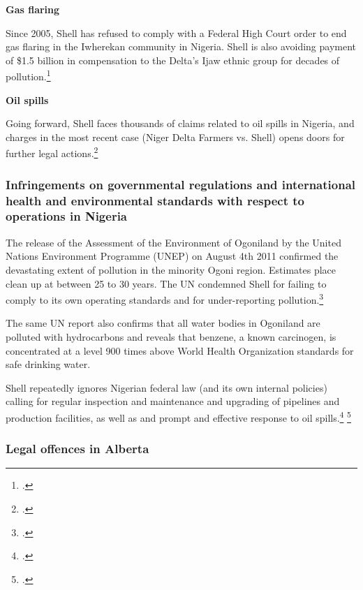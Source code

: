 \textbf{Gas flaring}



Since 2005, Shell has refused to comply with a Federal High Court order to end gas flaring in the Iwherekan community in Nigeria. 
Shell is also avoiding payment of \$1.5 billion in compensation to the Delta’s Ijaw ethnic group for decades of pollution.\footcite[][]{Ukala_2011}



\textbf{Oil spills}



Going forward, Shell faces thousands of claims related to oil spills in Nigeria, and charges in the most recent case (Niger Delta Farmers vs. Shell) opens doors for further legal actions.\footcite[][]{MixedVerdict_2012}



	\subsubsection{Infringements on governmental regulations and international health and environmental standards with respect to operations in Nigeria}
	
	
	
The release of the Assessment of the Environment of Ogoniland by the United Nations Environment Programme (UNEP) on August 4th 2011 confirmed the devastating extent of pollution in the minority Ogoni region. 
Estimates place clean up at between 25 to 30 years. 
The UN condemned Shell for failing to comply to its own operating standards and for under-reporting pollution.\footcite[][]{UNEP_2011}



The same UN report also confirms that all water bodies in Ogoniland are polluted with hydrocarbons and reveals that benzene, a known carcinogen, is concentrated at a level 900 times above World Health Organization standards for safe drinking water.



Shell repeatedly ignores Nigerian federal law (and its own internal policies) calling for regular inspection and maintenance and upgrading of pipelines and production facilities, as well as and prompt and effective response to oil spills.\footcite[][]{Steiner_2008}  \footcite[][]{Steiner_2010}



	\subsubsection{Legal offences in Alberta}
	

